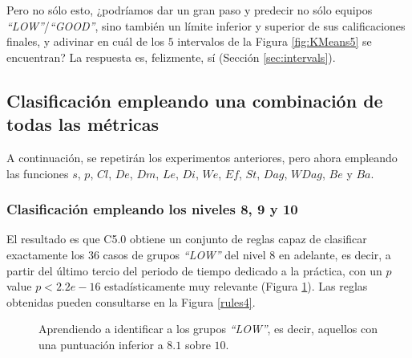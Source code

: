 Pero no sólo esto, ¿podríamos dar un gran paso y predecir no sólo equipos \emph{``LOW''}/\emph{``GOOD''}, sino también un límite inferior y superior de sus calificaciones finales, y adivinar en cuál de los $5$ intervalos de la Figura \ref{fig:KMeans5} se encuentran? La respuesta es, felizmente, sí (Sección \ref{sec:intervals}).

\subsection{Clasificación empleando una combinación de todas las métricas}

A continuación, se repetirán los experimentos anteriores, pero ahora empleando las funciones $s$, $p$, $Cl$, $De$, $Dm$, $Le$, $Di$, $We$, $Ef$, $St$, $Dag$, $WDag$, $Be$ y $Ba$.

\subsubsection{Clasificación empleando los niveles 8, 9 y 10}

El resultado es que C5.0 obtiene un conjunto de reglas capaz de clasificar exactamente los $36$ casos de grupos \emph{``LOW''} del nivel $8$ en adelante, es decir, a partir del último tercio del periodo de tiempo dedicado a la práctica, con un $p$ value $p < 2.2e-16$ estadísticamente muy relevante (Figura \ref{fig:cm4}). Las reglas obtenidas pueden consultarse en la Figura \ref{rules4}.

\begin{figure}[H]
\centering
{}
\caption{Aprendiendo a identificar a los grupos \emph{``LOW''}, es decir, aquellos con una puntuación inferior a $8.1$ sobre $10$.}
\label{fig:cm4}
\end{figure}

